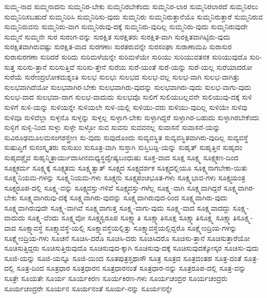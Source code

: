{ಸುಮ್ಮ-ನಾದ
ಸುಮ್ಮನಾದನು
ಸುಮ್ಮನಿರ-ಬೇಕು
ಸುಮ್ಮನಿರಬೇಕೆಂದು
ಸುಮ್ಮನಿರ-ಲಾರ
ಸುಮ್ಮನಿರಲಾರದೆ
ಸುಮ್ಮನಿರಲು
ಸುಮ್ಮನಿರಿಸಬಹುದೆ
ಸುಮ್ಮನಿರಿಸಿ
ಸುಮ್ಮನಿರಿಸು-ವುದು
ಸುಮ್ಮನಿರು
ಸುಮ್ಮನಿರುತ್ತಾನೆಯೊ
ಸುಮ್ಮನಿರುತ್ತಾರೆ
ಸುಮ್ಮನಿರುವ
ಸುಮ್ಮನಿರುವನು
ಸುಮ್ಮನಿರು-ವಾಗ
ಸುಮ್ಮನಿರುವು-ದಕ್ಕೆ
ಸುಮ್ಮನಿರು-ವುದಿಲ್ಲ
ಸುಮ್ಮನಿರು-ವುದು
ಸುಮ್ಮನಿರುವುದೇ
ಸುಮ್ಮನೆ
ಸುಮ್ಮನೇ
ಸುರ
ಸುರಂಗ-ವನ್ನು
ಸುರಕ್ಷಿತ
ಸುರಕ್ಷಿತರು
ಸುರಕ್ಷಿತ-ವಾಗಿ
ಸುರಕ್ಷಿತವಾಗಿಟ್ಟಿರು-ವುದು
ಸುರಕ್ಷಿತವಾಗಿರುವಷ್ಟು
ಸುರಕ್ಷಿತ-ವಾದ
ಸುರಗಣಾಃ
ಸುರತರುವನ್ನೇ
ಸುರಸಂಘಾ
ಸುರಾಣಾಮಪಿ
ಸುರಾಸುರ
ಸುರಾಸುರಗಣಾ
ಸುರಿದರೆ
ಸುರಿದು
ಸುರಿಮಳೆಯನ್ನೇ
ಸುರಿಮಳೆಯೇ
ಸುರಿಯು
ಸುರಿಯುವತನಕ
ಸುರಿಯುವುದೊ
ಸುರಿ-ಸುತ್ತ
ಸುರಿಸು-ತ್ತಾನೆ
ಸುರಿಸುತ್ತಿವೆ
ಸುರಿಸು-ತ್ತೇನೆ
ಸುರೆಯ
ಸುರೆ-ಯಂತೆ
ಸುರೆ-ಯನ್ನು
ಸುರೆ-ಯಲ್ಲ
ಸುರೆಯಾದರೋ
ಸುರೆಯೆ
ಸುರೇಂದ್ರಲೋಕಮಶ್ನಂತಿ
ಸುಲಭ
ಸುಲಭಃ
ಸುಲಭದ
ಸುಲಭ-ವಲ್ಲ
ಸುಲಭ-ವಾಗಿ
ಸುಲಭ-ವಾಗಿತ್ತು
ಸುಲಭವಾಗಿದೆಯೋ
ಸುಲಭವಾಗಿರ-ಬೇಕು
ಸುಲಭವಾಗಿರು-ವುದನ್ನು
ಸುಲಭವಾಗಿರು-ವುದು
ಸುಲಭ-ವಾಗು-ವುದು
ಸುಲಭ-ವಾದ
ಸುಲಭವಾ-ದಾಗ
ಸುಲಭ-ವಾದುದು
ಸುಲಭವೊ
ಸುಲಿಗೆ
ಸುಲಿಯಬಲ್ಲವನೇ
ಸುಲಿಯುವು-ದಕ್ಕೆ
ಸುಳಿ
ಸುಳಿಗೆ
ಸುಳಿ-ಯನ್ನು
ಸುಳಿಯನ್ನೇ
ಸುಳಿಯಲೇ
ಸುಳಿ-ಯಲ್ಲಿ
ಸುಳಿಯು-ವರು
ಸುಳಿಯು-ವುದಿಲ್ಲ
ಸುಳಿಯೇ
ಸುಳಿವು
ಸುಳಿವೂ
ಸುಳಿವೆಲ್ಲಾ
ಸುಳ್ಳನೊ
ಸುಳ್ಳನ್ನು
ಸುಳ್ಳಲ್ಲ
ಸುಳ್ಳಾಗ-ಬೇಕು
ಸುಳ್ಳಾಗಿದ್ದರೆ
ಸುಳ್ಳಾಗಿರ-ಬಹುದು
ಸುಳ್ಳಾಗಿರಬೇಕೆಂದು
ಸುಳ್ಳಿಗೆ
ಸುಳ್ಳಿ-ನಿಂದ
ಸುಳ್ಳು
ಸುಳ್ಳೇ
ಸುಳ್ಳೋ
ಸುವ
ಸುವನು
ಸುವವನಲ್ಲ
ಸುವಾಸನೆ
ಸುವಾಸನೆ-ಯನ್ನು
ಸುವಿರೂಢಮೂಲಮಸಂಗಶಸ್ತ್ರೇಣ
ಸು-ವುದು
ಸುವುದೊಂದು
ಸುವ್ಯವಸ್ಥಿತ
ಸುವ್ಯವಸ್ಥಿತವಾಗಿರು-ವುದಿಲ್ಲ
ಸುವ್ಯವಸ್ಥೆ
ಸುಷುಪ್ತಿಗೆ
ಸುಸಂಸ್ಕೃತರು
ಸುಸುಖಂ
ಸುಸೂತ್ರ-ವಾಗಿ
ಸುಸ್ತಾಗಿ
ಸುಸ್ತಿಬಡ್ಡಿ-ಯನ್ನು
ಸುಹೃತ್
ಸುಹೃತ್ತಿನ
ಸುಹೃದಂ
ಸುಹೃದಶ್ಚೈವ
ಸುಹೃನ್ಮಿತ್ರಾರ್ಯುದಾಸೀನಮಧ್ಯಸ್ಥದ್ವೇಷ್ಯಬಂಧುಷು
ಸೂಕ್ತ-ವಾದ
ಸೂಕ್ಷ
ಸೂಕ್ಷ್ಮ
ಸೂಕ್ಷ್ಮಕಣ-ದಿಂದ
ಸೂಕ್ಷ್ಮಕರ್ಮ
ಸೂಕ್ಷ್ಮಕ್ಕೆ
ಸೂಕ್ಷ್ಮತಮ
ಸೂಕ್ಷ್ಮತ್ವಾತ್
ಸೂಕ್ಷ್ಮದ
ಸೂಕ್ಷ್ಮದರ್ಶಕ
ಸೂಕ್ಷ್ಮದಲ್ಲಿಯೂ
ಸೂಕ್ಷ್ಮನಾಗಬೇಕಾ-ಯಿತು
ಸೂಕ್ಷ್ಮನಿಯಮ-ಗಳನ್ನು
ಸೂಕ್ಷ್ಮನಿಯಮ-ಗಳು
ಸೂಕ್ಷ್ಮನು
ಸೂಕ್ಷ್ಮಪಂಚಭೂತ-ಗಳು
ಸೂಕ್ಷ್ಮಭಾವ-ಗಳು
ಸೂಕ್ಷ್ಮಯಂತ್ರ
ಸೂಕ್ಷ್ಮರೂಪ-ದಲ್ಲಿ
ಸೂಕ್ಷ್ಮ-ವನ್ನು
ಸೂಕ್ಷ್ಮವಸ್ತು-ಗಳಿವೆ
ಸೂಕ್ಷ್ಮವಸ್ತು-ಗಳೆಲ್ಲ
ಸೂಕ್ಷ್ಮ-ವಾಗಿ
ಸೂಕ್ಷ್ಮವಾಗಿದ್ದರೆ
ಸೂಕ್ಷ್ಮವಾಗಿರ-ಬೇಕು
ಸೂಕ್ಷ್ಮವಾಗಿರುವು-ದಕ್ಕೆ
ಸೂಕ್ಷ್ಮವಾಗಿರು-ವುದನ್ನು
ಸೂಕ್ಷ್ಮವಾಗಿರುವುದ-ರಿಂದ
ಸೂಕ್ಷ್ಮವಾಗಿರು-ವುದು
ಸೂಕ್ಷ್ಮವಾಗಿರುವುದೇ
ಸೂಕ್ಷ್ಮ-ವಾಗಿವೆ
ಸೂಕ್ಷ್ಮವಾಗುತ್ತ
ಸೂಕ್ಷ್ಮ-ವಾಗು-ವುದು
ಸೂಕ್ಷ್ಮ-ವಾದ
ಸೂಕ್ಷ್ಮವಾದದ್ದು
ಸೂಕ್ಷ್ಮ-ವಾದುದು
ಸೂಕ್ಷ್ಮ-ವೆಂದು
ಸೂಕ್ಷ್ಮವೋ
ಸೂಕ್ಷ್ಮಸ್ವರೂಪ
ಸೂಕ್ಷ್ಮಾತಿ
ಸೂಕ್ಷ್ಮಾತಿಸೂಕ್ಷ
ಸೂಕ್ಷ್ಮಾತಿಸೂಕ್ಷ್ಮ
ಸೂಕ್ಷ್ಮಾತಿಸೂಕ್ಷ್ಮ-ವಾದ
ಸೂಕ್ಷ್ಮಾವಸ್ಥೆ
ಸೂಕ್ಷ್ಮಾವಸ್ಥೆ-ಯಲ್ಲಿ
ಸೂಕ್ಷ್ಮಾವಸ್ಥೆಯಲ್ಲಿತ್ತು
ಸೂಕ್ಷ್ಮಾವಸ್ಥೆಯಲ್ಲಿದ್ದರೊ
ಸೂಕ್ಷ್ಮೇಂದ್ರಿಯ-ಗಳನ್ನು
ಸೂಕ್ಷ್ಮೇಂದ್ರಿಯ-ಗಳು
ಸೂಚನೆ
ಸೂಚಿಸಿ-ದರೊ
ಸೂಚಿಸಿ-ದರು
ಸೂಚಿಸಿದರೊ
ಸೂಚಿಸು-ತ್ತಾನೆ
ಸೂಚಿಸುತ್ತಾರೆಯೋ
ಸೂಚಿಸುತ್ತಿದ್ದರು
ಸೂಚಿಸುತ್ತಿರುವುದೊ
ಸೂಚಿಸುವುದ-ಕ್ಕಾಗಿ
ಸೂಚಿಸುವು-ದಕ್ಕೆ
ಸೂಚಿಸುವುದಕ್ಕೋಸ್ಕರ
ಸೂಚಿಸು-ವುದು
ಸೂಜಿ-ಯನ್ನು
ಸೂಜಿ-ಯನ್ನೂ
ಸೂಜಿ-ಯಿಂದ
ಸೂತಪುತ್ರಸ್ತಥಾಸೌ
ಸೂತ್ರ
ಸೂತ್ರದ
ಸೂತ್ರದಂತಹ
ಸೂತ್ರ-ದಂತೆ
ಸೂತ್ರ-ದಲ್ಲಿ
ಸೂತ್ರ-ದಿಂದ
ಸೂತ್ರಧಾರ
ಸೂತ್ರಧಾರನ
ಸೂತ್ರಧಾರನಂತೆ
ಸೂತ್ರಧಾರ-ನನ್ನು
ಸೂತ್ರರೂಪ-ದಲ್ಲಿ
ಸೂತ್ರ-ವನ್ನು
ಸೂತ್ರೇ
ಸೂಯತೇ
ಸೂರ್ಯ
ಸೂರ್ಯಕಿರಣ
ಸೂರ್ಯಕಿರಣ-ಗಳು
ಸೂರ್ಯಚಂದ್ರರ
ಸೂರ್ಯಚಂದ್ರರು
ಸೂರ್ಯಚಂದ್ರರೇ
ಸೂರ್ಯನ
ಸೂರ್ಯನಂತೆ
ಸೂರ್ಯ-ನನ್ನು
ಸೂರ್ಯನನ್ನೇ
}
